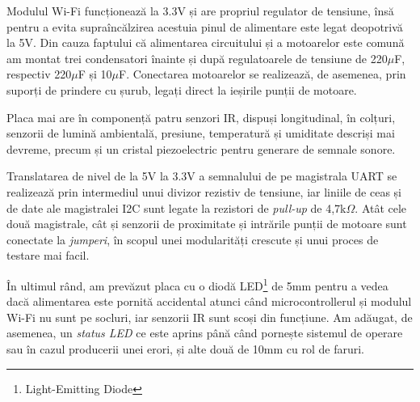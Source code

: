 Modulul Wi-Fi funcționează la 3.3V și are propriul regulator de tensiune, însă pentru a evita supraîncălzirea acestuia pinul de alimentare este legat deopotrivă la 5V. Din cauza faptului că alimentarea circuitului și a motoarelor este comună am montat trei condensatori înainte și după regulatoarele de tensiune de 220$\mu$F, respectiv 220$\mu$F și 10$\mu$F. Conectarea motoarelor se realizează, de asemenea, prin suporți de prindere cu șurub, legați direct la ieșirile punții de motoare.

\newpage
Placa mai are în componență patru senzori IR, dispuși longitudinal, în colțuri, senzorii de lumină ambientală, presiune, temperatură și umiditate descriși mai devreme, precum și un cristal piezoelectric pentru generare de semnale sonore.

Translatarea de nivel de la 5V la 3.3V a semnalului de pe magistrala UART se realizează prin intermediul unui divizor rezistiv de tensiune, iar liniile de ceas și de date ale magistralei I2C sunt legate la rezistori de \textit{pull-up} de 4,7k$\Omega$. Atât cele două magistrale, cât și senzorii de proximitate și intrările punții de motoare sunt conectate la \textit{jumperi}, în scopul unei modularități crescute și unui proces de testare mai facil.


În ultimul rând, am prevăzut placa cu o diodă LED\footnote{Light-Emitting Diode} de 5mm pentru a vedea dacă alimentarea este pornită accidental atunci când microcontrollerul și modulul Wi-Fi nu sunt pe socluri, iar senzorii IR sunt scoși din funcțiune. Am adăugat, de asemenea, un \textit{status LED} ce este aprins până când pornește sistemul de operare sau în cazul producerii unei erori, și alte două de 10mm cu rol de faruri.

